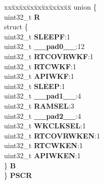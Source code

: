 \begin{DoxyCompactItemize}
\begin{tabbing}
\end{tabbing}\item 
\mbox{\label{structCRP__tag_a6ed1aaa4d826cae7504bbae3134b1d58}} 
\begin{tabbing}
xx\=xx\=xx\=xx\=xx\=xx\=xx\=xx\=xx\=\kill
union \{\\
\>uint32\_t {\bfseries R}\\
\>struct \{\\
\>\>uint32\_t {\bfseries SLEEPF}:1\\
\>\>uint32\_t {\bfseries \_\_pad0\_\_}:12\\
\>\>uint32\_t {\bfseries RTCOVRWKF}:1\\
\>\>uint32\_t {\bfseries RTCWKF}:1\\
\>\>uint32\_t {\bfseries APIWKF}:1\\
\>\>uint32\_t {\bfseries SLEEP}:1\\
\>\>uint32\_t {\bfseries \_\_pad1\_\_}:4\\
\>\>uint32\_t {\bfseries RAMSEL}:3\\
\>\>uint32\_t {\bfseries \_\_pad2\_\_}:4\\
\>\>uint32\_t {\bfseries WKCLKSEL}:1\\
\>\>uint32\_t {\bfseries RTCOVRWKEN}:1\\
\>\>uint32\_t {\bfseries RTCWKEN}:1\\
\>\>uint32\_t {\bfseries APIWKEN}:1\\
\>\} {\bfseries B}\\
\} {\bfseries PSCR}\\


\end{tabbing}
\end{DoxyCompactItemize}
